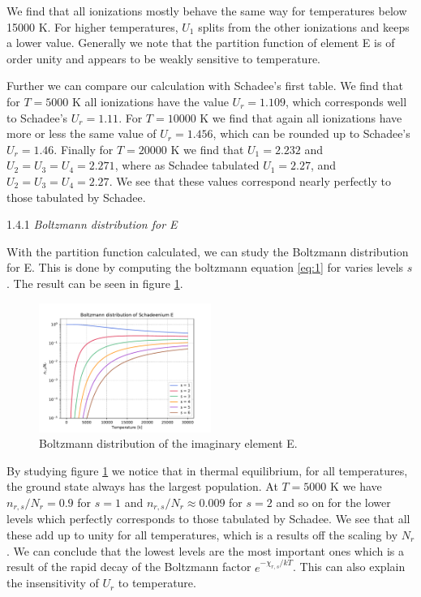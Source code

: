 \documentclass[a4paper,11.5pt,]{article}
\begin{document}
\begin{multicols}{2}
\noindent We find that all ionizations mostly behave the same way for temperatures below 15000 K. For higher temperatures, $U_1$ splits from the other ionizations and keeps a lower value. Generally we note that the partition function of element E is of order unity and appears to be weakly sensitive to temperature. 

Further we can compare our calculation with Schadee's first table. We find that for $T=5000$ K all ionizations have the value $U_r = 1.109$, which corresponds well to Schadee's $U_r = 1.11$. For $T = 10000$ K we find that again all ionizations have more or less the same value of $U_r = 1.456$, which can be rounded up to Schadee's $U_r = 1.46$. Finally for $T = 20000$ K we find that $U_1 = 2.232$ and $U_2 = U_3 = U_4 = 2.271$, where as Schadee tabulated $U_1 = 2.27$, and $U_2 = U_3 = U_4 = 2.27$. We see that these values correspond nearly perfectly to those tabulated by Schadee.

\begin{center}
1.4.1 \textit{ Boltzmann distribution for E}
\end{center}
With the partition function calculated, we can study the Boltzmann distribution for E. This is done by computing the boltzmann equation \eqref{eq:1} for varies levels $s$. The result can be seen in figure \ref{fig:2}.

\begin{figure}[H]
	\centering
	\includegraphics[width=0.5\textwidth]{figures/boltz_E.pdf}
	\caption{Boltzmann distribution of the imaginary element E.}
	\label{fig:2}
\end{figure}

\noindent By studying figure \ref{fig:2} we notice that in thermal equilibrium, for all temperatures, the ground state always has the largest population. At $T = 5000$ K we have $n_{r,s}/N_r = 0.9$ for $s = 1$ and $n_{r,s}/N_r \approx 0.009$ for $s=2$ and so on for the lower levels which perfectly corresponds to those tabulated by Schadee. We see that all these add up to unity for all temperatures, which is a results off the scaling by $N_r$. We can conclude that the lowest levels are the most important ones which is a result of the rapid decay of the Boltzmann factor $e^{-\chi_{r,s}/kT}$. This can also explain the insensitivity of $U_r$ to temperature. 


\end{multicols}
\end{document}
